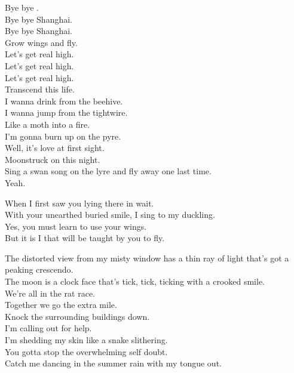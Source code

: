 


Bye bye . \\
Bye bye Shanghai. \\
Bye bye Shanghai. \\
Grow wings and fly. \\
Let's get real high. \\
Let's get real high. \\
Let's get real high. \\
Transcend this life. \\

I wanna drink from the beehive. \\
I wanna jump from the tightwire. \\
Like a moth into a fire. \\
I'm gonna burn up on the pyre. \\
Well, it's love at first sight. \\
Moonstruck on this night. \\
Sing a swan song on the lyre and fly away one last time. \\
Yeah. \\


When I first saw you lying there in wait. \\
With your unearthed buried smile, I sing to my duckling. \\
Yes, you must learn to use your wings. \\
But it is I that will be taught by you to fly. \\


The distorted view from my misty window has a thin ray of light that's got a peaking crescendo. \\
The moon is a clock face that's tick, tick, ticking with a crooked smile. \\
We're all in the rat race. \\
Together we go the extra mile. \\

Knock the surrounding buildings down. \\
I'm calling out for help. \\
I'm shedding my skin like a snake slithering. \\
You gotta stop the overwhelming self doubt. \\
Catch me dancing in the summer rain with my tongue out. \\
